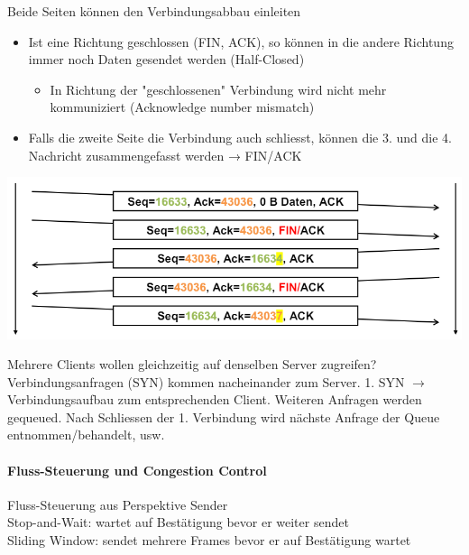 \begin{example}
    Beide Seiten können den Verbindungsabbau einleiten
    \begin{itemize}
        \item Ist eine Richtung geschlossen (FIN, ACK), so können in die andere Richtung immer noch Daten gesendet werden (Half-Closed)
        \begin{itemize}
            \item In Richtung der "geschlossenen" Verbindung wird nicht mehr kommuniziert (Acknowledge number mismatch)
        \end{itemize}
        \item Falls die zweite Seite die Verbindung auch schliesst, können die 3. und die 4. Nachricht zusammengefasst werden → FIN/ACK
    \end{itemize}
    \centering
        \includegraphics[width=0.8\linewidth]{images/tcp_verbindungsabbau_ex.png}
\end{example}


\begin{remark}
    Mehrere Clients wollen gleichzeitig auf denselben Server zugreifen?\\
    Verbindungsanfragen (SYN) kommen nacheinander zum Server. 1. SYN $\rightarrow$ Verbindungsaufbau zum entsprechenden Client. 
    Weiteren Anfragen werden gequeued. Nach Schliessen der 1. Verbindung wird nächste Anfrage der Queue entnommen/behandelt, usw.
\end{remark}




\paragraph*{Fluss-Steuerung und Congestion Control}



\begin{concept}{Fluss-Steuerung} aus Perspektive Sender\\
    Stop-and-Wait: wartet auf Bestätigung bevor er weiter sendet\\
    Sliding Window: sendet mehrere Frames bevor er auf Bestätigung wartet
\end{concept}

